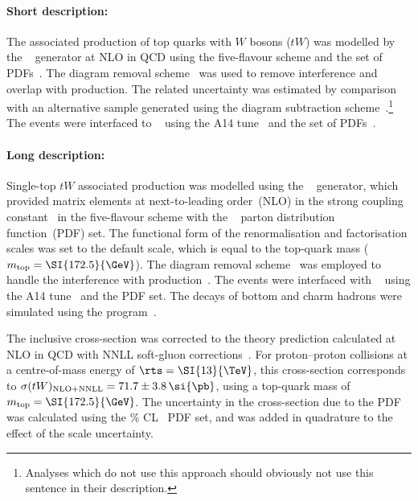 \paragraph{Short description:}

The associated production of top quarks with $W$ bosons ($tW$) was
modelled by the
\POWHEGBOX[v2]~\cite{Re:2010bp,Nason:2004rx,Frixione:2007vw,Alioli:2010xd}
generator at NLO in QCD using the five-flavour scheme and the
\NNPDF[3.0nlo] set of PDFs~\cite{Ball:2014uwa}.
The diagram removal scheme~\cite{Frixione:2008yi} was used to
remove interference and overlap with \ttbar production. 
The related uncertainty was estimated by comparison with an alternative sample
generated using the diagram subtraction scheme~\cite{Frixione:2008yi,ATL-PHYS-PUB-2016-020}.\footnote{Analyses which do not use this approach 
should obviously not use this sentence in their description.} 
The events were interfaced to \PYTHIA[8.230]~\cite{Sjostrand:2014zea} using the A14
tune~\cite{ATL-PHYS-PUB-2014-021} and the \NNPDF[2.3lo] set of
PDFs~\cite{Ball:2012cx}.




\paragraph{Long description:}

Single-top $tW$ associated production was modelled using the
\POWHEGBOX[v2]~\cite{Re:2010bp,Nason:2004rx,Frixione:2007vw,Alioli:2010xd}
generator, which provided matrix elements at next-to-leading
order~(NLO) in the strong coupling constant \alphas\ in the five-flavour 
scheme with the \NNPDF[3.0nlo]~\cite{Ball:2014uwa} parton
distribution function~(PDF) set.  The functional form of the
renormalisation and factorisation scales was set to the default scale,
which is equal to the top-quark mass ($\mtop = \SI{172.5}{\GeV}$).  
The diagram removal scheme~\cite{Frixione:2008yi} was employed to handle the interference
with \ttbar production~\cite{ATL-PHYS-PUB-2016-020}.  The events were
interfaced with \PYTHIA[8.230]~\cite{Sjostrand:2014zea} using the A14
tune~\cite{ATL-PHYS-PUB-2014-021} and the \NNPDF[2.3lo] PDF set.  The
decays of bottom and charm hadrons were simulated using the
\EVTGEN[1.6.0] program~\cite{Lange:2001uf}.

The inclusive cross-section was corrected to the theory prediction
calculated at NLO in QCD with NNLL soft-gluon
corrections~\cite{Kidonakis:2010ux,Kidonakis:2013zqa}.  For proton--proton
collisions at a centre-of-mass energy of $\rts = \SI{13}{\TeV}$, this
cross-section corresponds to $\sigma(tW)_{\text{NLO+NNLL}} = 71.7 \pm 3.8\,\si{\pb}$,
using a top-quark mass of $\mtop = \SI{172.5}{\GeV}$.  The uncertainty in
the cross-section due to the PDF was calculated using the \%
CL~\cite{Martin:2009iq,Martin:2009bu} PDF set, and was added in
quadrature to the effect of the scale uncertainty.

